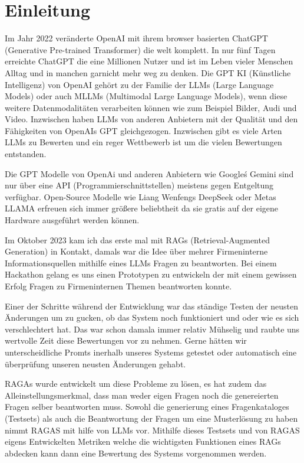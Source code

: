 \chapter{Einleitung}

Im Jahr 2022 veränderte OpenAI mit ihrem browser basierten ChatGPT (Generative Pre-trained Transformer) die welt komplett. In nur fünf Tagen erreichte ChatGPT die eine Millionen Nutzer und ist im Leben vieler Menschen Alltag und in manchen garnicht mehr weg zu denken.
Die GPT KI (Künstliche Intelligenz) von OpenAI gehört zu der Familie der LLMs (Large Language Models) oder auch MLLMs (Multimodal Large Language Models), wenn diese weitere Datenmodalitäten verarbeiten können wie zum Beispiel Bilder, Audi und Video.
Inzwischen haben LLMs von anderen Anbietern mit der Qualität und den Fähigkeiten von OpenAIs GPT gleichgezogen. Inzwischen gibt es viele Arten LLMs zu Bewerten und ein reger Wettbewerb ist um die vielen Bewertungen entstanden.

Die GPT Modelle von OpenAi und anderen Anbietern wie Google\'s Gemini sind nur über eine API (Programmierschnittstellen) meistens gegen Entgeltung verfügbar.
Open-Source Modelle wie Liang Wenfengs DeepSeek oder Metas LLAMA erfreuen sich immer größere beliebtheit da sie gratis auf der eigene Hardware ausgeführt werden können.

Im Oktober 2023 kam ich das erste mal mit RAGs (Retrieval-Augmented Generation) in Kontakt, damals war die Idee über mehrer Firmeninterne Informationsquellen mithilfe eines LLMs Fragen zu beantworten.
Bei einem Hackathon gelang es uns einen Prototypen zu entwickeln der mit einem gewissen Erfolg Fragen zu Firmeninternen Themen beantworten konnte.

Einer der Schritte während der Entwicklung war das ständige Testen der neusten Änderungen um zu gucken, ob das System noch funktioniert und oder wie es sich verschlechtert hat.
Das war schon damala immer relativ Mühselig und raubte uns wertvolle Zeit diese Bewertungen vor zu nehmen.
Gerne hätten wir unterscheidliche Promts inerhalb unseres Systems getestet oder automatisch eine überprüfung unseren neusten Änderungen gehabt.

RAGAs wurde entwickelt um diese Probleme zu lösen, es hat zudem das Alleinstellungsmerkmal, dass man weder eigen Fragen noch die genereierten Fragen selber beantworten muss.
Sowohl die generierung eines Fragenkataloges (Testsets) als auch die Beantwortung der Fragen um eine Musterlösung zu haben nimmt RAGAS mit hilfe von LLMs vor.
Mithilfe dieses Testsets und von RAGAS eigens Entwickelten Metriken welche die wichtigsten Funktionen eines RAGs abdecken kann dann eine Bewertung des Systems vorgenommen werden.

